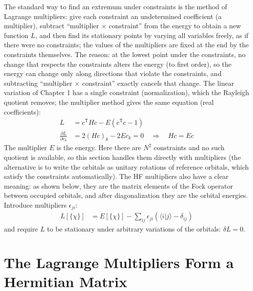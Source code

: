 The standard way to find an extremum under constraints is the method of Lagrange multipliers: give each constraint an undetermined coefficient (a multiplier), subtract ``multiplier $\times$ constraint'' from the energy to obtain a new function $L$, and then find its stationary points by varying all variables freely, as if there were no constraints; the values of the multipliers are fixed at the end by the constraints themselves. The reason: at the lowest point under the constraints, no change that respects the constraints alters the energy (to first order), so the energy can change only along directions that violate the constraints, and subtracting ``multiplier $\times$ constraint'' exactly cancels that change. The linear variation of Chapter 1 has a single constraint (normalization), which the Rayleigh quotient removes; the multiplier method gives the same equation (real coefficients):
\begin{align*}
L &= c^{\mathsf T} H c - E (c^{\mathsf T} c - 1) \\
\frac{\partial L}{\partial c_k} &= 2 (H c)_k - 2 E c_k = 0 \quad \Rightarrow \quad H c = E c
\end{align*}
The multiplier $E$ is the energy. Here there are $N^2$ constraints and no such quotient is available, so this section handles them directly with multipliers (the alternative is to write the orbitals as unitary rotations of reference orbitals, which satisfy the constraints automatically). The HF multipliers also have a clear meaning: as shown below, they are the matrix elements of the Fock operator between occupied orbitals, and after diagonalization they are the orbital energies. Introduce multipliers $\epsilon_{ji}$:
\begin{align}\label{eq:hf-lagrangian}
L[\{\chi\}] &= E[\{\chi\}] - \sum_{ij} \epsilon_{ji} (\langle i|j\rangle - \delta_{ij})
\end{align}
and require $L$ to be stationary under arbitrary variations of the orbitals: $\delta L = 0$.

\section{The Lagrange Multipliers Form a Hermitian Matrix}

